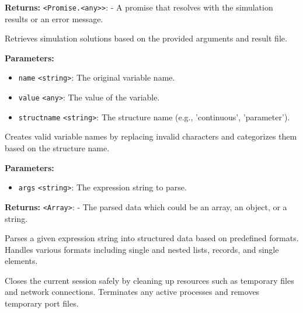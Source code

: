 \documentclass[12pt,a4paper]{article}
\begin{document}
\noindent \textbf{Returns:} \texttt{<Promise.<any>>}: - A promise that resolves with the simulation results or an error message.

\noindent Retrieves simulation solutions based on the provided arguments and result file.

\vspace{5mm}
\noindent {}


\noindent \textbf{Parameters:}
\begin{itemize}
  \item \texttt{name} \texttt{<string>}: The original variable name.
  \item \texttt{value} \texttt{<any>}: The value of the variable.
  \item \texttt{structname} \texttt{<string>}: The structure name (e.g., 'continuous', 'parameter').
\end{itemize}

\noindent Creates valid variable names by replacing invalid characters and categorizes them based on the structure name.

\vspace{5mm}
\noindent {}


\noindent \textbf{Parameters:}
\begin{itemize}
  \item \texttt{args} \texttt{<string>}: The expression string to parse.
\end{itemize}

\noindent \textbf{Returns:} \texttt{<Array>}: - The parsed data which could be an array, an object, or a string.

\noindent Parses a given expression string into structured data based on predefined formats.
Handles various formats including single and nested lists, records, and single elements.

\vspace{5mm}
\noindent {}


\noindent Closes the current session safely by cleaning up resources such as temporary files and network connections.
Terminates any active processes and removes temporary port files.
\end{document}

